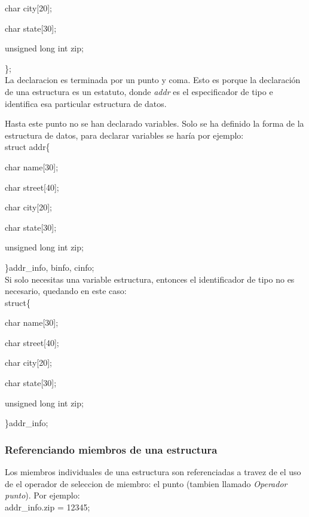 \documentclass[]{article}
\begin{document}
			char city[20];

			char state[30];
			
			unsigned long int zip;
			
			\};\\
			
			La declaracion es terminada por un punto y coma. Esto es porque la declaración de una estructura es un estatuto, donde \textit{addr} es el especificador de tipo e identifica esa particular estructura de datos.
			
			Hasta este punto no se han declarado variables. Solo se ha definido la forma de la estructura de datos, para declarar variables se haría por ejemplo:\\
			
			struct addr\{
			
			char name[30];
			
			char street[40];
			
			char city[20];
			
			char state[30];
			
			unsigned long int zip;
			
			\}addr\_info, binfo, cinfo;\\
			
			Si solo necesitas una variable estructura, entonces el identificador de tipo no es necesario, quedando en este caso:\\
			
			struct\{
			
			char name[30];
			
			char street[40];
			
			char city[20];
			
			char state[30];
			
			unsigned long int zip;
			
			\}addr\_info;\\
			
			\subsubsection{Referenciando miembros de una estructura}
			
				Los miembros individuales de una estructura son referenciadas a travez de el uso de el operador de seleccion de miembro: el punto (tambien llamado \textit{Operador punto}). Por ejemplo:\\
			
				addr\_info.zip = 12345;\\
			
\end{document}

